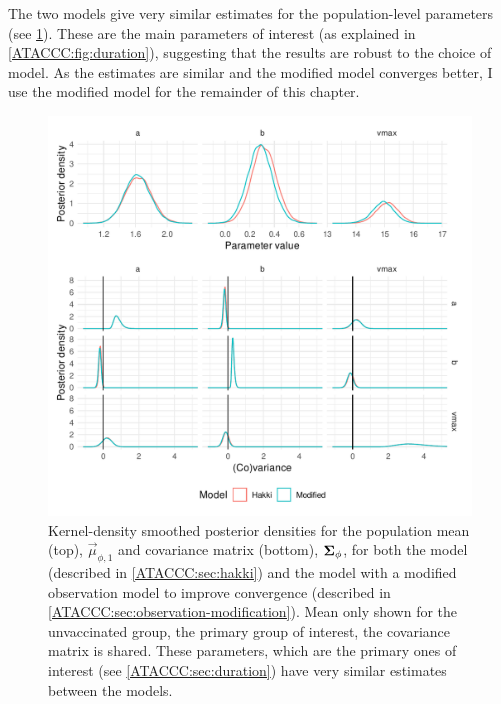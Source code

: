 \documentclass[thesis.tex]{subfiles}
\begin{document}
The two models give very similar estimates for the population-level parameters (see \cref{ATACCC:fig:compare-hakki-modified}).
These are the main parameters of interest (as explained in \cref{ATACCC:fig:duration}), suggesting that the results are robust to the choice of model.
As the estimates are similar and the modified model converges better, I use the modified model for the remainder of this chapter.
\begin{figure}
  \centering \includegraphics{ATACCC/compare_hakki_modified}
  \caption[Comparison of population-level parameters between models.]{Kernel-density smoothed posterior densities for the population mean (top), $\vec{\mu}_{\phi,1}$ and covariance matrix (bottom), $\bm{\Sigma}_\phi$, for both the \textcite{hakkiOnset} model (described in \cref{ATACCC:sec:hakki}) and the model with a modified observation model to improve convergence (described in \cref{ATACCC:sec:observation-modification}). Mean only shown for the unvaccinated group, the primary group of interest, the covariance matrix is shared. These parameters, which are the primary ones of interest (see \cref{ATACCC:sec:duration}) have very similar estimates between the models. \label{ATACCC:fig:compare-hakki-modified}}
\end{figure}
\end{document}
